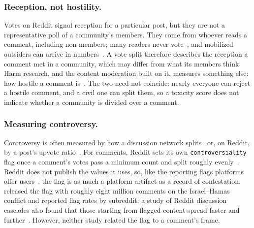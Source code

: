 \subsubsection{Reception, not hostility.}

Votes on Reddit signal reception for a particular post, but they are not a representative poll of a community's members. They come from whoever reads a comment, including non-members; many readers never vote~\cite{gilbert2013underprovision}, and mobilized outsiders can arrive in numbers~\cite{kumar2018conflict}. A vote split therefore describes the reception a comment met in a community, which may differ from what its members think. Harm research, and the content moderation built on it, measures something else: how hostile a comment is~\cite{lees2022perspective}. The two need not coincide: nearly everyone can reject a hostile comment, and a civil one can split them, so a toxicity score does not indicate whether a community is divided over a comment.


\subsubsection{Measuring controversy.}

Controversy is often measured by how a discussion network splits~\cite{garimella2016controversy,garimella2018controversy} or, on Reddit, by a post's upvote ratio~\cite {hessel2019controversy}. For comments, Reddit sets its own \texttt{controversiality} flag once a comment's votes pass a minimum count and split roughly evenly~\cite{reddit2017source}. Reddit does not publish the values it uses, so, like the reporting flags platforms offer users~\cite{crawford2016flag}, the flag is as much a platform artifact as a record of contestation. \citet{chen2024isamasred} released the flag with roughly eight million comments on the Israel--Hamas conflict and reported flag rates by subreddit; a study of Reddit discussion cascades also found that those starting from flagged content spread faster and further~\cite{jasser2021controversial}. However, neither study related the flag to a comment's frame.



